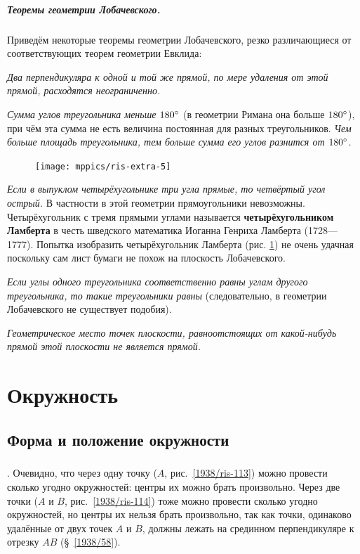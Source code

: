 \documentclass[twoside]{book}
\makeatletter
\newcommand{\rindex}[2][\imki@jobname]{%
  \index[#1]{\detokenize{#2}}%
}
\makeatother
\begin{document}
\paragraph{Теоремы геометрии Лобачевского.}\label{1914/95} Приведём некоторые теоремы геометрии Лобачевского, резко различающиеся от соответствующих теорем геометрии Евклида:

\emph{Два перпендикуляра к одной и той же прямой, по мере удаления
от этой прямой, расходятся неограниченно.}

\emph{Сумма углов треугольника меньше $180\degree$} (в геометрии Римана она
больше $180\degree$), при чём эта сумма не есть величина постоянная для разных треугольников.
\emph{Чем больше площадь треугольника, тем больше сумма его углов разнится от $180\degree$.}



\begin{figure}
\centering
\texttt{[image: mppics/ris-extra-5]}
\caption{}\label{extra/ris-5}
\end{figure}

\emph{Если в выпуклом четырёхугольнике три угла прямые, то четвёртый угол острый.} В частности в этой геометрии прямоугольники невозможны.
Четырёхугольник с тремя прямыми углами называется \rindex{четырёхугольник Ламберта}\textbf{четырёхугольником Ламберта} в честь шведского математика Иоганна Генриха Ламберта (1728---1777).
Попытка изобразить четырёхугольник Ламберта (рис. \ref{extra/ris-5}) не очень удачная поскольку сам лист бумаги не похож на плоскость Лобачевского. %


\emph{Если углы одного треугольника соответственно равны углам другого треугольника, то такие треугольники равны} (следовательно, в геометрии Лобачевского не существует подобия).

\emph{Геометрическое место точек плоскости, равноотстоящих от какой-нибудь прямой этой плоскости не является прямой.}


\chapter{Окружность}

\section{Форма и положение окружности}

\paragraph{}\label{1938/103}
.
Очевидно, что через одну точку ($A$, рис.~\ref{1938/ris-113}) можно провести сколько угодно окружностей:
центры их можно брать произвольно.
Через две точки ($A$ и $B$, рис.~\ref{1938/ris-114}) тоже можно провести сколько угодно окружностей, но центры их нельзя брать произвольно, так как точки, одинаково удалённые от двух точек $A$ и $B$, должны лежать на срединном перпендикуляре к отрезку $AB$ (§~\ref{1938/58}). 
\end{document}
